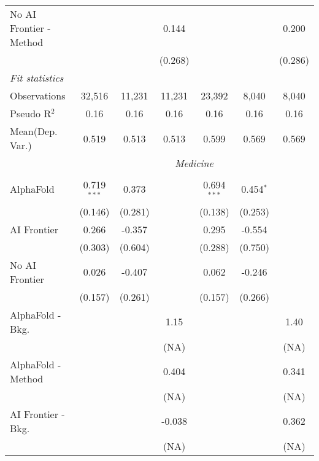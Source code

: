 \begin{tabular}{lcccccc}
   No AI Frontier - Method &               &               & 0.144         &               &               & 0.200\\   
                           &               &               & (0.268)       &               &               & (0.286)\\   
   \midrule
   \emph{Fit statistics}\\
   Observations            & 32,516        & 11,231        & 11,231        & 23,392        & 8,040         & 8,040\\  
   Pseudo R$^2$            & 0.16          & 0.16          & 0.16          & 0.16          & 0.16          & 0.16\\  
   
Mean(Dep. Var.) & 0.519 & 0.513 & 0.513 & 0.599 & 0.569 & 0.569 \\
 & \multicolumn{6}{c}{\textit{Medicine}} \\ \\
   AlphaFold               & 0.719$^{***}$ & 0.373   &        & 0.694$^{***}$ & 0.454$^{*}$ &   \\   
                           & (0.146)       & (0.281) &        & (0.138)       & (0.253)     &   \\   
   AI Frontier             & 0.266         & -0.357  &        & 0.295         & -0.554      &   \\   
                           & (0.303)       & (0.604) &        & (0.288)       & (0.750)     &   \\   
   No AI Frontier          & 0.026         & -0.407  &        & 0.062         & -0.246      &   \\   
                           & (0.157)       & (0.261) &        & (0.157)       & (0.266)     &   \\   
   AlphaFold - Bkg.        &               &         & 1.15   &               &             & 1.40\\   
                           &               &         & (NA)   &               &             & (NA)\\   
   AlphaFold - Method      &               &         & 0.404  &               &             & 0.341\\   
                           &               &         & (NA)   &               &             & (NA)\\   
   AI Frontier - Bkg.      &               &         & -0.038 &               &             & 0.362\\   
                           &               &         & (NA)   &               &             & (NA)\\   

\end{tabular}
